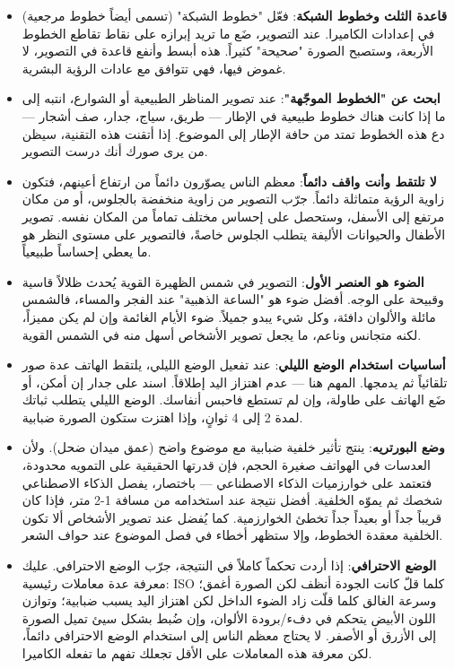 \begin{itemize}
  \item \textbf{قاعدة الثلث وخطوط الشبكة}: فعّل "خطوط الشبكة" (تسمى أيضاً خطوط مرجعية) في إعدادات الكاميرا. عند التصوير، ضَع ما تريد إبرازه على نقاط تقاطع الخطوط الأربعة، وستصبح الصورة "صحيحة" كثيراً. هذه أبسط وأنفع قاعدة في التصوير، لا غموض فيها، فهي تتوافق مع عادات الرؤية البشرية.
  \item \textbf{ابحث عن "الخطوط الموجّهة"}: عند تصوير المناظر الطبيعية أو الشوارع، انتبه إلى ما إذا كانت هناك خطوط طبيعية في الإطار — طريق، سياج، جدار، صف أشجار — دع هذه الخطوط تمتد من حافة الإطار إلى الموضوع. إذا أتقنت هذه التقنية، سيظن من يرى صورك أنك درست التصوير.
  \item \textbf{لا تلتقط وأنت واقف دائماً}: معظم الناس يصوّرون دائماً من ارتفاع أعينهم، فتكون زاوية الرؤية متماثلة دائماً. جرّب التصوير من زاوية منخفضة بالجلوس، أو من مكان مرتفع إلى الأسفل، وستحصل على إحساس مختلف تماماً من المكان نفسه. تصوير الأطفال والحيوانات الأليفة يتطلب الجلوس خاصةً، فالتصوير على مستوى النظر هو ما يعطي إحساساً طبيعياً.
  \item \textbf{الضوء هو العنصر الأول}: التصوير في شمس الظهيرة القوية يُحدث ظلالاً قاسية وقبيحة على الوجه. أفضل ضوء هو "الساعة الذهبية" عند الفجر والمساء، فالشمس مائلة والألوان دافئة، وكل شيء يبدو جميلاً. ضوء الأيام الغائمة وإن لم يكن مميزاً، لكنه متجانس وناعم، ما يجعل تصوير الأشخاص أسهل منه في الشمس القوية.
  \item \textbf{أساسيات استخدام الوضع الليلي}: عند تفعيل الوضع الليلي، يلتقط الهاتف عدة صور تلقائياً ثم يدمجها. المهم هنا — عدم اهتزاز اليد إطلاقاً. اسند على جدار إن أمكن، أو ضَع الهاتف على طاولة، وإن لم تستطع فاحبس أنفاسك. الوضع الليلي يتطلب ثباتك لمدة 2 إلى 4 ثوانٍ، وإذا اهتزت ستكون الصورة ضبابية.
\end{itemize}


\begin{itemize}
  \item \textbf{وضع البورتريه}: ينتج تأثير خلفية ضبابية مع موضوع واضح (عمق ميدان ضحل). ولأن العدسات في الهواتف صغيرة الحجم، فإن قدرتها الحقيقية على التمويه محدودة، فتعتمد على خوارزميات الذكاء الاصطناعي — باختصار، يفصل الذكاء الاصطناعي شخصك ثم يموّه الخلفية. أفضل نتيجة عند استخدامه من مسافة 1-2 متر، فإذا كان قريباً جداً أو بعيداً جداً تخطئ الخوارزمية. كما يُفضل عند تصوير الأشخاص ألا تكون الخلفية معقدة الخطوط، وإلا ستظهر أخطاء في فصل الموضوع عند حواف الشعر.
  \item \textbf{الوضع الاحترافي}: إذا أردت تحكماً كاملاً في النتيجة، جرّب الوضع الاحترافي. عليك معرفة عدة معاملات رئيسية: ISO كلما قلّ كانت الجودة أنظف لكن الصورة أغمق؛ وسرعة الغالق كلما قلّت زاد الضوء الداخل لكن اهتزاز اليد يسبب ضبابية؛ وتوازن اللون الأبيض يتحكم في دفء/برودة الألوان، وإن ضُبط بشكل سيئ تميل الصورة إلى الأزرق أو الأصفر. لا يحتاج معظم الناس إلى استخدام الوضع الاحترافي دائماً، لكن معرفة هذه المعاملات على الأقل تجعلك تفهم ما تفعله الكاميرا.
\end{itemize}

